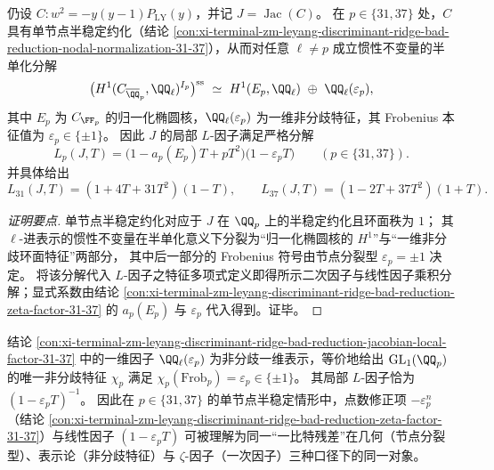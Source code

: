 \begin{conclusion}\label{con:xi-terminal-zm-leyang-discriminant-ridge-bad-reduction-jacobian-local-factor-31-37}
仍设 \(C:w^{2}=-y(y-1)P_{\mathrm{LY}}(y)\)，并记 \(J=\operatorname{Jac}(C)\)。
在 \(p\in\{31,37\}\) 处，\(C\) 具有单节点半稳定约化（结论 \ref{con:xi-terminal-zm-leyang-discriminant-ridge-bad-reduction-nodal-normalization-31-37}），从而对任意 \(\ell\neq p\) 成立惯性不变量的半单化分解
\[
\bigl(H^{1}(C_{\overline{\QQ}_{p}},\QQ_{\ell})^{I_{p}}\bigr)^{\mathrm{ss}}
\ \simeq\
H^{1}(E_{p},\QQ_{\ell})\ \oplus\ \QQ_{\ell}(\varepsilon_{p}),
\]
其中 \(E_p\) 为 \(C_{\FF_p}\) 的归一化椭圆核，\(\QQ_{\ell}(\varepsilon_{p})\) 为一维非分歧特征，其 Frobenius 本征值为 \(\varepsilon_p\in\{\pm 1\}\)。
因此 \(J\) 的局部 \(L\)-因子满足严格分解
\[
\boxed{\ L_{p}(J,T)=\bigl(1-a_{p}(E_{p})T+pT^{2}\bigr)\bigl(1-\varepsilon_{p}T\bigr)\qquad(p\in\{31,37\}).\ }
\]
并具体给出
\[
L_{31}(J,T)=(1+4T+31T^{2})(1-T),\qquad
L_{37}(J,T)=(1-2T+37T^{2})(1+T).
\]
\end{conclusion}
\begin{proof}[证明要点]
单节点半稳定约化对应于 \(J\) 在 \(\QQ_p\) 上的半稳定约化且环面秩为 \(1\)；
其 \(\ell\)-进表示的惯性不变量在半单化意义下分裂为“归一化椭圆核的 \(H^{1}\)”与“一维非分歧环面特征”两部分，
其中后一部分的 Frobenius 符号由节点分裂型 \(\varepsilon_p=\pm 1\) 决定。
将该分解代入 \(L\)-因子之特征多项式定义即得所示二次因子与线性因子乘积分解；显式系数由结论 \ref{con:xi-terminal-zm-leyang-discriminant-ridge-bad-reduction-zeta-factor-31-37} 的 \(a_p(E_p)\) 与 \(\varepsilon_p\) 代入得到。证毕。
\end{proof}

\begin{remark}\label{rem:xi-terminal-zm-leyang-local-langlands-gl1-onebit}
结论 \ref{con:xi-terminal-zm-leyang-discriminant-ridge-bad-reduction-jacobian-local-factor-31-37} 中的一维因子 \(\QQ_\ell(\varepsilon_p)\) 为非分歧一维表示，等价地给出 \(\mathrm{GL}_1(\QQ_p)\) 的唯一非分歧特征 \(\chi_p\) 满足
\(
\chi_p(\mathrm{Frob}_p)=\varepsilon_p\in\{\pm 1\}
\)。
其局部 \(L\)-因子恰为 \((1-\varepsilon_pT)^{-1}\)。
因此在 \(p\in\{31,37\}\) 的单节点半稳定情形中，点数修正项 \(-\varepsilon_p^n\)（结论 \ref{con:xi-terminal-zm-leyang-discriminant-ridge-bad-reduction-zeta-factor-31-37}）与线性因子 \((1-\varepsilon_pT)\) 可被理解为同一“一比特残差”在几何（节点分裂型）、表示论（非分歧特征）与 \(\zeta\)-因子（一次因子）三种口径下的同一对象。
\end{remark}

